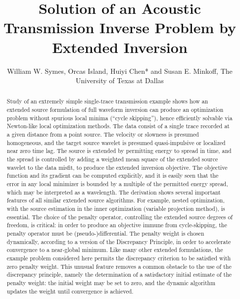 \title{Solution of an Acoustic Transmission Inverse Problem by Extended Inversion}
\author{William W. Symes, Orcas Island, Huiyi Chen* and Susan E. Minkoff, The University of Texas at Dallas}



\maketitle
\begin{abstract}
  Study of an extremely simple single-trace transmission example shows
  how an extended source formulation of full waveform inversion can
  produce an optimization problem without spurious local minima
  (``cycle skipping''), hence efficiently solvable via Newton-like
  local optimization methods. The data consist of a single trace
  recorded at a given distance from a point source. The velocity or
  slowness is presumed homogeneous, and the target source wavelet is
  presumed quasi-impulsive or localized near zero time lag. The source
  is extended by permitting energy to spread in time, and the spread
  is controlled by adding a weighted mean square of the extended
  source wavelet to the data misfit, to produce the extended inversion
  objective. The objective function and its gradient can be computed
  explicitly, and it is easily seen that the error in any local
  minimizer is bounded by a multiple of the permitted energy spread,
  which may be interpreted as a wavelength. The derivation shows several
  important features of all similar extended source algorithms. For
  example, nested optimization, with the source estimation in the
  inner optimization (variable projection method), is essential. The
  choice of the penalty operator, controlling the extended source
  degrees of freedom, is critical: in order to produce an objective
  immune from cycle-skipping, the penalty operator must be
  (pseudo-)differential. The penalty weight is chosen dynamically,
  according to a version of the Discrepancy Principle, in order to
  accelerate convergence to a near-global minimum. Like many other
  extended formulations, the example problem considered here permits
  the discrepancy criterion to be satisfied with zero penalty
  weight. This unusual feature removes a common obstacle to the use of
  the discrepancy principle, namely the determination of a
  satisfactory initial estimate of the penalty weight: the initial weight may
  be set to zero, and the dynamic algorithm updates the weight until
  convergence is achieved.

\end{abstract}

